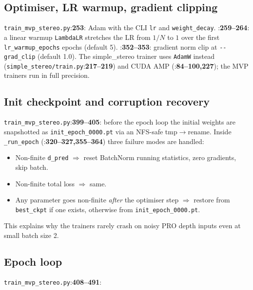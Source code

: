 \documentclass[11pt]{article}
\newcommand{\fref}[2]{\texttt{\textcolor{filegray}{#1}}:\textbf{#2}}
\begin{document}
\subsection{Optimiser, LR warmup, gradient clipping}
\fref{train\_mvp\_stereo.py}{253}: Adam with the CLI \texttt{lr} and
\texttt{weight\_decay}. \fref{}{259--264}: a linear warmup
\texttt{LambdaLR} stretches the LR from $1/N$ to $1$ over the first
\texttt{lr\_warmup\_epochs} epochs (default 5).
\fref{}{352--353}: gradient norm clip at \texttt{-{}-grad\_clip}
(default 1.0). The simple\_stereo trainer uses \texttt{AdamW} instead
(\fref{simple\_stereo/train.py}{217--219}) and CUDA AMP
(\fref{}{84--100,227}); the MVP trainers run in full precision.

\subsection{Init checkpoint and corruption recovery}
\fref{train\_mvp\_stereo.py}{399--405}: before the epoch loop the
initial weights are snapshotted as \texttt{init\_epoch\_0000.pt} via an
NFS-safe tmp$\to$rename. Inside \texttt{\_run\_epoch}
(\fref{}{320--327,355--364}) three failure modes are handled:
\begin{itemize}[leftmargin=2em]
  \item Non-finite \texttt{d\_pred} $\Rightarrow$ reset BatchNorm
        running statistics, zero gradients, skip batch.
  \item Non-finite total loss $\Rightarrow$ same.
  \item Any parameter goes non-finite \emph{after} the optimiser step
        $\Rightarrow$ restore from \texttt{best\_ckpt} if one exists,
        otherwise from \texttt{init\_epoch\_0000.pt}.
\end{itemize}
This explains why the trainers rarely crash on noisy PRO depth inputs
even at small batch size 2.

\subsection{Epoch loop}
\fref{train\_mvp\_stereo.py}{408--491}:
\end{document}
